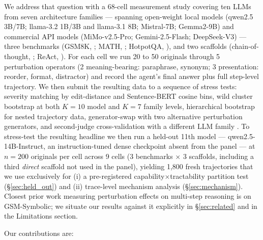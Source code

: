 \documentclass[11pt]{article}
\begin{document}
We address that question with a 68-cell measurement study covering ten LLMs from seven architecture families --- spanning open-weight local models (qwen2.5 3B/7B; llama-3.2 1B/3B and llama-3.1 8B; Mistral-7B; Gemma2-9B) and commercial API models (MiMo-v2.5-Pro; Gemini-2.5-Flash; DeepSeek-V3) --- three benchmarks (GSM8K, \citealp{cobbe2021training}; MATH, \citealp{hendrycks2021measuring}; HotpotQA, \citealp{yang2018hotpotqa}), and two scaffolds (chain-of-thought, \citealp{wei2022chain}; ReAct, \citealp{yao2023react}). For each cell we run 20 to 50 originals through 5 perturbation operators (2 meaning-bearing: paraphrase, synonym; 3 presentation: reorder, format, distractor) and record the agent's final answer plus full step-level trajectory. We then submit the resulting data to a sequence of stress tests: severity matching by edit-distance and Sentence-BERT cosine bins, wild cluster bootstrap \citep{cameron2008bootstrap,roodman2019fast} at both $K{=}10$ model and $K{=}7$ family levels, hierarchical bootstrap for nested trajectory data, generator-swap with two alternative perturbation generators, and second-judge cross-validation with a different LLM family \citep{zheng2023judging}. To stress-test the resulting headline we then run a held-out 11th model --- qwen2.5-14B-Instruct, an instruction-tuned dense checkpoint absent from the panel --- at $n{=}200$ originals per cell across 9 cells (3 benchmarks $\times$ 3 scaffolds, including a third \emph{direct} scaffold not used in the panel), yielding 1{,}800 fresh trajectories that we use exclusively for (i) a pre-registered capability$\times$tractability partition test (\S\ref{sec:held_out}) and (ii) trace-level mechanism analysis (\S\ref{sec:mechanism}). Closest prior work measuring perturbation effects on multi-step reasoning is \citet{mirzadeh2024gsm} on GSM-Symbolic; we situate our results against it explicitly in \S\ref{sec:related} and in the Limitations section.

Our contributions are:
\end{document}
